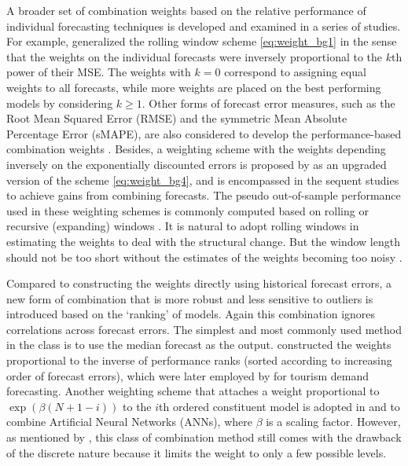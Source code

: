 \documentclass[11pt]{article}
\begin{document}
A broader set of combination weights based on the relative performance of individual forecasting techniques is developed and examined in a series of studies. For example, \cite{Stock1998-np} generalized the rolling window scheme \eqref{eq:weight_bg1} in the sense that the weights on the individual forecasts were inversely proportional to the $k$th power of their MSE. The weights with $k=0$ correspond to assigning equal weights to all forecasts, while more weights are placed on the best performing models by considering $k \geq 1$. Other forms of forecast error measures, such as the Root Mean Squared Error (RMSE) and the symmetric Mean Absolute Percentage Error (sMAPE), are also considered to develop the performance-based combination weights \citep[e.g.,][]{Nowotarski2014-ev,Pawlikowski2020-hm}. Besides, a weighting scheme with the weights depending inversely on the exponentially discounted errors is proposed by \cite{Stock2004-rq} as an upgraded version of the scheme \eqref{eq:weight_bg4}, and is encompassed in the sequent studies \citep[e.g.,][]{Clark2010-jx,Genre2013-ut} to achieve gains from combining forecasts. The pseudo out-of-sample performance used in these weighting schemes is commonly computed based on rolling or recursive (expanding) windows \citep[e.g.,][]{Stock1998-np,Clark2010-jx,Genre2013-ut}. It is natural to adopt rolling windows in estimating the weights to deal with the structural change. But the window length should not be too short without the estimates of the weights becoming too noisy \citep{Baumeister2015-ft}.

Compared to constructing the weights directly using historical forecast errors, a new form of combination that is more robust and less sensitive to outliers is introduced based on the `ranking' of models. Again this combination ignores correlations across forecast errors. The simplest and most commonly used method in the class is to use the median forecast as the output. \cite{Aiolfi2006-rh} constructed the weights proportional to the inverse of performance ranks (sorted according to increasing order of forecast errors), which were later employed by \cite{Andrawis2011-kb} for tourism demand forecasting. Another weighting scheme that attaches a weight proportional to $\exp (\beta(N+1-i))$ to the $i$th ordered constituent model is adopted in \cite{Yao2008-or} and \cite{Donate2013-lq} to combine Artificial Neural Networks (ANNs), where $\beta$ is a scaling factor. However, as mentioned by \cite{Andrawis2011-kb}, this class of combination method still comes with the drawback of the discrete nature because it limits the weight to only a few possible levels.
\end{document}

